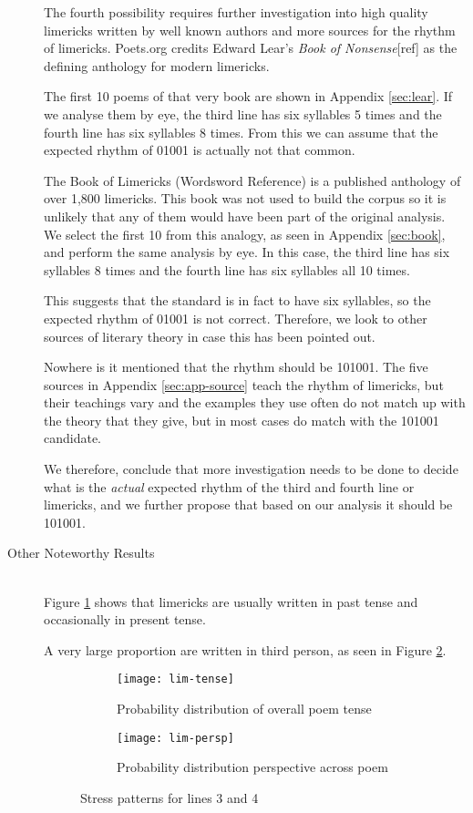 \begin{description}
The fourth possibility requires further investigation into high quality limericks written by well known authors and more sources for the rhythm of limericks. Poets.org credits Edward Lear's \textit{Book of Nonsense}[ref] as the defining anthology for modern limericks.

The first 10 poems of that very book are shown in Appendix \ref{sec:lear}. If we analyse them by eye, the third line has six syllables 5 times and the fourth line has six syllables 8 times. From this we can assume that the expected rhythm of 01001 is actually not that common.

The Book of Limericks (Wordsword Reference) is a published anthology of over 1,800 limericks. This book was not used to build the corpus so it is unlikely that any of them would have been part of the original analysis. We select the first 10 from this analogy, as seen in Appendix \ref{sec:book}, and perform the same analysis by eye. In this case, the third line has six syllables 8 times and the fourth line has six syllables all 10 times.

This suggests that the standard is in fact to have six syllables, so the expected rhythm of 01001 is not correct. Therefore, we look to other sources of literary theory in case this has been pointed out.

Nowhere is it mentioned that the rhythm should be 101001. The five sources in Appendix \ref{sec:app-source} teach the rhythm of limericks, but their teachings vary and the examples they use often do not match up with the theory that they give, but in most cases do match with the 101001 candidate.

We therefore, conclude that more investigation needs to be done to decide what is the \textit{actual} expected rhythm of the third and fourth line or limericks, and we further propose that based on our analysis it should be 101001.

\item[Other Noteworthy Results]  \hfill \\
Figure \ref{fig:lim-tense} shows that limericks are usually written in past tense and occasionally in present tense.

A very large proportion are written in third person, as seen in Figure \ref{fig:lim-persp}.

\begin{figure}[H]
\centering
\begin{subfigure}[t]{0.5\textwidth}
	\centering
    \texttt{[image: lim-tense]}
    \caption{Probability distribution of overall poem tense}
    \label{fig:lim-tense}
\end{subfigure}
\begin{subfigure}[t]{0.5\textwidth}
	\centering
    \texttt{[image: lim-persp]}
    \caption{Probability distribution perspective across poem}
    \label{fig:lim-persp}
\end{subfigure}
\caption{Stress patterns for lines 3 and 4}
\label{fig:lim5}
\end{figure}

\end{description}



